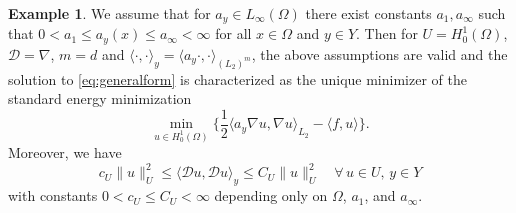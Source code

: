 \documentclass[a4paper,11pt]{amsart}
\numberwithin{equation}{section}
\theoremstyle{definition}
\newtheorem{example}[theorem]{Example}
\theoremstyle{remark}
\theoremstyle{plain}
\begin{document}
\begin{example}
\label{ex:E}
We assume that for $a_y\in L_\infty(\Omega)$ there exist constants $a_1, a_\infty$ such that $0<a_1\le a_y(x)\le a_\infty <\infty$ for all $x\in\Omega$ and $y \in Y$.
Then for $U= H^1_0(\Omega)$, $\mathcal D = \nabla$, $m = d$ and $\langle \cdot, \cdot \rangle_y = \langle a_y \cdot, \cdot\rangle_{(L_2)^m}$, the above assumptions are valid and the solution to 
\eqref{eq:generalform} is characterized as the unique minimizer of
the standard energy minimization
\begin{equation}\tag{E}\label{eq:E}
   \min_{u \in H^1_0(\Omega) } \bigl\{  \textstyle\frac12 \displaystyle \langle a_y \nabla u, \nabla u \rangle_{L_2} - \langle f, u\rangle \bigr\}.
\end{equation}
Moreover, we have
\begin{equation}
\label{stabvar}
c_U\|u\|^2_{U}\leq \langle \mathcal Du,\mathcal Du\rangle_y	\leq C_U\|u\|^2_{U}\quad  \forall \,u\in U, \,y\in Y
\end{equation}
with constants $0<c_U \le C_U<\infty$ depending only on $\Omega$, $a_1$, and $a_\infty$.
\end{example}
\end{document}
